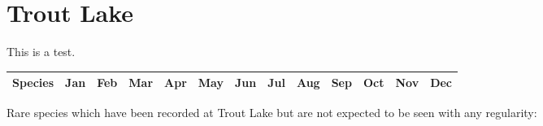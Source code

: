 \documentclass[8pt,letterpaper,notumble,foldmark]{leaflet}
\begin{document}
\selectfont

\section{Trout Lake}

This is a test.

\newpage

\linespread{0}

{\footnotesize
\tabcolsep=0.005cm

\begin{longtable}{|l|llllllllllllllllllllllllllllllllllllllllllllllll|}
\hline
Species & \multicolumn{4}{c}{Jan} & \multicolumn{4}{c}{Feb} & \multicolumn{4}{c}{Mar} &
\multicolumn{4}{c}{Apr} & \multicolumn{4}{c}{May} & \multicolumn{4}{c}{Jun} &
\multicolumn{4}{c}{Jul} & \multicolumn{4}{c}{Aug} & \multicolumn{4}{c}{Sep} &
\multicolumn{4}{c}{Oct} & \multicolumn{4}{c}{Nov} & \multicolumn{4}{c}{Dec} \\
\hline
\endhead



\hline
\end{longtable}
}

Rare species which have been recorded at Trout Lake but are not expected to be seen with any regularity: 
\end{document}
